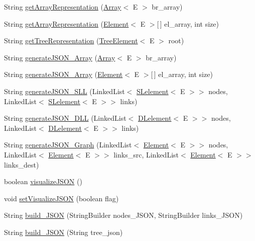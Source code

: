 \begin{DoxyCompactItemize}
\item 
String \hyperlink{classbridges_1_1base_1_1_a_d_t_visualizer_ab3e96c568b11f9ef683191d1e03d5719}{get\+Array\+Representation} (\hyperlink{classbridges_1_1base_1_1_array}{Array}$<$ E $>$ br\+\_\+array)
\item 
String \hyperlink{classbridges_1_1base_1_1_a_d_t_visualizer_ad44bb58d6f9c630cc6bbcae175003243}{get\+Array\+Representation} (\hyperlink{classbridges_1_1base_1_1_element}{Element}$<$ E $>$\mbox{[}$\,$\mbox{]} el\+\_\+array, int size)
\item 
String \hyperlink{classbridges_1_1base_1_1_a_d_t_visualizer_ae01d3d38d5c7c3ac239e86d6be46a50a}{get\+Tree\+Representation} (\hyperlink{classbridges_1_1base_1_1_tree_element}{Tree\+Element}$<$ E $>$ root)
\item 
String \hyperlink{classbridges_1_1base_1_1_a_d_t_visualizer_a1f37c20302432878a91c03544b81cc27}{generate\+J\+S\+O\+N\+\_\+\+Array} (\hyperlink{classbridges_1_1base_1_1_array}{Array}$<$ E $>$ br\+\_\+array)
\item 
String \hyperlink{classbridges_1_1base_1_1_a_d_t_visualizer_a309d4f0521b66bb1329c0362f1ca5d33}{generate\+J\+S\+O\+N\+\_\+\+Array} (\hyperlink{classbridges_1_1base_1_1_element}{Element}$<$ E $>$\mbox{[}$\,$\mbox{]} el\+\_\+array, int size)
\item 
String \hyperlink{classbridges_1_1base_1_1_a_d_t_visualizer_adf2164b7f4b3befb8b2cb2904efd8c91}{generate\+J\+S\+O\+N\+\_\+\+S\+LL} (Linked\+List$<$ \hyperlink{classbridges_1_1base_1_1_s_lelement}{S\+Lelement}$<$ E $>$$>$ nodes, Linked\+List$<$ \hyperlink{classbridges_1_1base_1_1_s_lelement}{S\+Lelement}$<$ E $>$$>$ links)
\item 
String \hyperlink{classbridges_1_1base_1_1_a_d_t_visualizer_a866df531965d152d5686304f07e15a4a}{generate\+J\+S\+O\+N\+\_\+\+D\+LL} (Linked\+List$<$ \hyperlink{classbridges_1_1base_1_1_d_lelement}{D\+Lelement}$<$ E $>$$>$ nodes, Linked\+List$<$ \hyperlink{classbridges_1_1base_1_1_d_lelement}{D\+Lelement}$<$ E $>$$>$ links)
\item 
String \hyperlink{classbridges_1_1base_1_1_a_d_t_visualizer_aabf7cbfbed0cd28b365206281176834b}{generate\+J\+S\+O\+N\+\_\+\+Graph} (Linked\+List$<$ \hyperlink{classbridges_1_1base_1_1_element}{Element}$<$ E $>$$>$ nodes, Linked\+List$<$ \hyperlink{classbridges_1_1base_1_1_element}{Element}$<$ E $>$$>$ links\+\_\+src, Linked\+List$<$ \hyperlink{classbridges_1_1base_1_1_element}{Element}$<$ E $>$$>$ links\+\_\+dest)
\item 
boolean \hyperlink{classbridges_1_1base_1_1_a_d_t_visualizer_a1aa47f3633239060197b523cb6b86e06}{visualize\+J\+S\+ON} ()
\item 
void \hyperlink{classbridges_1_1base_1_1_a_d_t_visualizer_a784ce15d23e6c8ff0d6e77f2274e2980}{set\+Visualize\+J\+S\+ON} (boolean flag)
\item 
String \hyperlink{classbridges_1_1base_1_1_a_d_t_visualizer_a86ec26c0bb98a48a63366ce380ca958f}{build\+\_\+\+J\+S\+ON} (String\+Builder nodes\+\_\+\+J\+S\+ON, String\+Builder links\+\_\+\+J\+S\+ON)
\item 
String \hyperlink{classbridges_1_1base_1_1_a_d_t_visualizer_a520eef21260f327101b7e013f9814c45}{build\+\_\+\+J\+S\+ON} (String tree\+\_\+json)
\end{DoxyCompactItemize}
